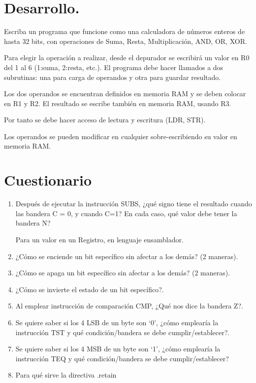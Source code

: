 \documentclass[a4paper,11pt]{article}                 %
\begin{document}
 \section{Desarrollo.}

 Escriba un programa que funcione como una calculadora de números enteros de hasta 32 bits, con operaciones de Suma, Resta, Multiplicación, AND, OR, XOR. 

 Para elegir la operación a realizar, desde el depurador se escribirá un valor en R0 del 1 al 6 (1:suma, 2:resta, etc.). El programa debe hacer llamados a dos subrutinas: una para carga de operandos y otra para guardar resultado.
 
  Los dos operandos se encuentran definidos en memoria RAM y se deben colocar en R1 y R2. El resultado se escribe también en memoria RAM, usando R3. 
  
  Por tanto se debe hacer acceso de lectura y escritura (LDR, STR). 
  
  Los operandos se pueden modificar en cualquier sobre-escribiendo su valor en memoria RAM. 


  
  \section{Cuestionario}
  
  \begin{enumerate}
  	\item Después de ejecutar la instrucción SUBS, ¿qué signo tiene el resultado cuando las bandera C = 0, y cuando C=1? En cada caso, qué valor debe tener la bandera N? 
  	
  	Para un valor en un Registro, en lenguaje ensamblador.

  	\item ¿Cómo se enciende un bit específico sin afectar a los demás? (2 maneras).

  	\item ¿Cómo se apaga un bit específico sin afectar a los demás? (2 maneras).
  	
  	\item ¿Cómo se invierte el estado de un bit específico?.
  	
  	\item Al emplear instrucción de comparación CMP, ¿Qué nos dice la bandera Z?.
  	
  	\item Se quiere saber si los 4 LSB de un byte son ‘0’, ¿cómo emplearía la instrucción TST y qué condición/bandera se debe cumplir/establecer?.
  	
  	\item Se quiere saber si los 4 MSB de un byte son ‘1’, ¿cómo emplearía la instrucción TEQ y qué condición/bandera se debe cumplir/establecer? 
  	
  	\item Para qué sirve la directiva .retain 
  	  
  \end{enumerate}
\end{document}
